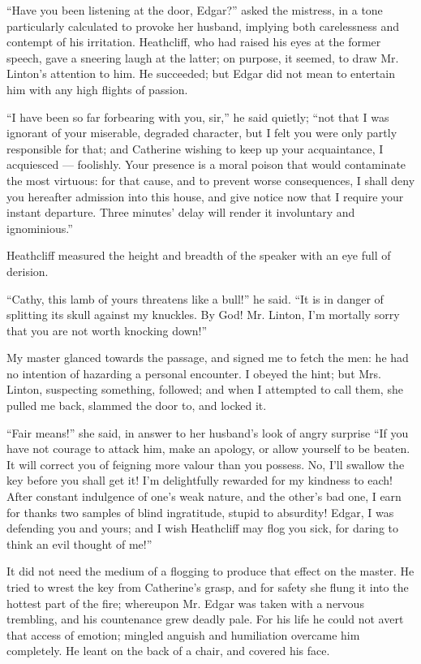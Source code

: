 \par “Have you been listening at the door, Edgar?” asked the mistress, in a tone particularly calculated to provoke her husband, implying both carelessness and contempt of his irritation. Heathcliff, who had raised his eyes at the former speech, gave a sneering laugh at the latter; on purpose, it seemed, to draw Mr. Linton's attention to him. He succeeded; but Edgar did not mean to entertain him with any high flights of passion.
\par “I have been so far forbearing with you, sir,” he said quietly; “not that I was ignorant of your miserable, degraded character, but I felt you were only partly responsible for that; and Catherine wishing to keep up your acquaintance, I acquiesced — foolishly. Your presence is a moral poison that would contaminate the most virtuous: for that cause, and to prevent worse consequences, I shall deny you hereafter admission into this house, and give notice now that I require your instant departure. Three minutes' delay will render it involuntary and ignominious.”
\par Heathcliff measured the height and breadth of the speaker with an eye full of derision.
\par “Cathy, this lamb of yours threatens like a bull!” he said. “It is in danger of splitting its skull against my knuckles. By God! Mr. Linton, I'm mortally sorry that you are not worth knocking down!”
\par My master glanced towards the passage, and signed me to fetch the men: he had no intention of hazarding a personal encounter. I obeyed the hint; but Mrs. Linton, suspecting something, followed; and when I attempted to call them, she pulled me back, slammed the door to, and locked it.
\par “Fair means!” she said, in answer to her husband's look of angry surprise “If you have not courage to attack him, make an apology, or allow yourself to be beaten. It will correct you of feigning more valour than you possess. No, I'll swallow the key before you shall get it! I'm delightfully rewarded for my kindness to each! After constant indulgence of one's weak nature, and the other's bad one, I earn for thanks two samples of blind ingratitude, stupid to absurdity! Edgar, I was defending you and yours; and I wish Heathcliff may flog you sick, for daring to think an evil thought of me!”
\par It did not need the medium of a flogging to produce that effect on the master. He tried to wrest the key from Catherine's grasp, and for safety she flung it into the hottest part of the fire; whereupon Mr. Edgar was taken with a nervous trembling, and his countenance grew deadly pale. For his life he could not avert that access of emotion; mingled anguish and humiliation overcame him completely. He leant on the back of a chair, and covered his face.
